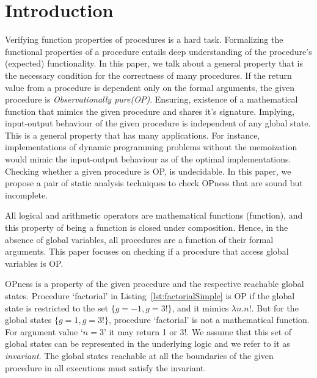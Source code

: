 \documentclass{llncs}
\begin{document}
\section{Introduction}
Verifying function properties of procedures is a hard task. 
Formalizing the functional properties of a procedure entails
deep understanding of the procedure's (expected) functionality.
In this paper, we talk about a general property that is the necessary
condition for the correctness of many procedures. If the return value
from a procedure is dependent only on the formal arguments, the given
procedure is \textit{Observationally pure(OP)}.
Ensuring, existence of a mathematical function that mimics the given
procedure and shares it's signature. Implying, input-output behaviour
of the given procedure is independent of any global state. This is a
general property that has many applications.  For instance,
implementations of dynamic programming problems without the
memoization would mimic the input-output behaviour as of the optimal
implementations. Checking whether a given procedure is OP, is
undecidable. In this paper, we propose a pair of static analysis
techniques to check OPness that are sound but incomplete.

All logical and arithmetic operators are mathematical functions
(function), and this property of being a function is closed under
composition.
Hence, in the absence of global variables, all procedures
are a function of their formal arguments. This paper focuses on
checking if a procedure that access global variables is OP.

OPness is a property of the given procedure and the respective
reachable global states.  Procedure `factorial' in
Listing~\ref{lst:factorialSimple} is OP if the global state is
restricted to the set $\{g = -1, g = 3!\}$, and it mimics $\lambda
n.n!$. But for the global states $\{g = 1, g = 3!\}$, procedure
`factorial' is not a mathematical function. For argument value `$n =
3$' it may return 1 or 3!.  We assume that this set of global states
can be represented in the underlying logic and we refer to it as
\textit{invariant}. The global states reachable at all the boundaries
of the given procedure in all executions must satisfy the invariant.
\end{document}
